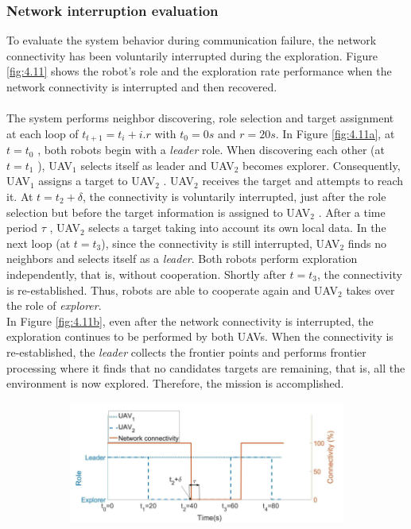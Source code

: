 \documentclass[11pt,openany]{book}
\begin{document}
\begin{algorimth}[H]
\subsubsection{Network interruption evaluation}
To evaluate the system behavior during communication failure, the network connectivity has been voluntarily interrupted during the exploration. Figure \ref{fig:4.11} shows the robot’s role and the exploration rate performance when the network connectivity is interrupted and then recovered.\\\\
The system performs neighbor discovering, role selection and target assignment at each loop of $t_{t+1}=t_i+i.r$ with $t_0=0s$ and $r=20s$. In Figure \ref{fig:4.11a}, at $t=t_0$ , both robots begin with a \textit{leader} role. When discovering each other (at $t=t_1$ ), UAV$_1$ selects itself as leader and UAV$_2$ becomes explorer. Consequently, UAV$_1$ assigns a target to UAV$_2$ . UAV$_2$ receives the target and attempts to reach it. At $t=t_2+\delta $, the connectivity is voluntarily interrupted, just after the role selection but before the target information is assigned to UAV$_2$ . After a time period $\tau $ , UAV$_2$ selects a target taking into account its own local data. In the next loop (at $t=t_3$), since the connectivity is still interrupted, UAV$_2$ ﬁnds no neighbors and selects itself as a \textit{leader}. Both robots perform exploration independently, that is, without cooperation. Shortly after $t=t_3$, the connectivity is re-established. Thus, robots are able to cooperate again and UAV$_2$ takes over the role of \textit{explorer}.\\
In Figure \ref{fig:4.11b}, even after the network connectivity is interrupted, the exploration continues to be performed by both UAVs. When the connectivity is re-established, the \textit{leader} collects the frontier points and performs frontier processing where it ﬁnds that no candidates targets are remaining, that is, all the environment is now explored. Therefore, the mission is accomplished.
\begin{figure}[H]
    \centering
    \begin{subfigure}[H]{0.8\linewidth}
        \includegraphics[width=\linewidth]{assets/4_11_a.png}

\end{subfigure}
\end{figure}
\end{algorimth}
\end{document}
